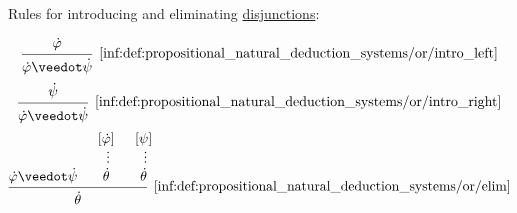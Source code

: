 \begin{definition}
\begin{thmenum}
     Rules for introducing and eliminating \hyperref[def:propositional_alphabet/connectives/disjunction]{disjunctions}:
    \begin{ThreeColumns}
      \begin{equation*}\taglabel[\( \vee^{+_L} \)]{inf:def:propositional_natural_deduction_systems/or/intro_left}
        \begin{prooftree}
          \hypo{ \syn\varphi }
          \infer1[\ref{inf:def:propositional_natural_deduction_systems/or/intro_left}]{ \syn\varphi \synvee \syn\psi }
        \end{prooftree}
      \end{equation*}
    \BeginSecondColumn
      \begin{equation*}\taglabel[\( \vee^{+_R} \)]{inf:def:propositional_natural_deduction_systems/or/intro_right}
        \begin{prooftree}
          \hypo{ \syn\psi }
          \infer1[\ref{inf:def:propositional_natural_deduction_systems/or/intro_right}]{ \syn\varphi \synvee \syn\psi }
        \end{prooftree}
      \end{equation*}
    \BeginThirdColumn
      \begin{equation*}\taglabel[\( \vee^- \)]{inf:def:propositional_natural_deduction_systems/or/elim}
        \begin{prooftree}
          \hypo{ \syn\varphi \synvee \syn\psi }
          \hypo{ [\syn\varphi] }
          \ellipsis {} { \syn\theta }
          \hypo{ [\psi] }
          \ellipsis {} { \syn\theta }
          \infer3[\ref{inf:def:propositional_natural_deduction_systems/or/elim}]{ \syn\theta }
        \end{prooftree}
      \end{equation*}
    \end{ThreeColumns}


\end{thmenum}
\end{definition}
